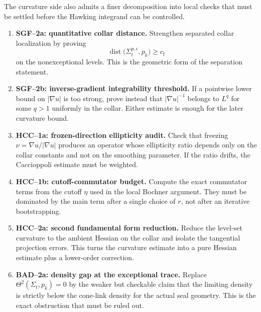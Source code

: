 \begin{remark}
\label{rem:TipNeckCurvatureHyperatomicRoadmap}
The curvature side also admits a finer decomposition into local checks that
must be settled before the Hawking integrand can be controlled.
\begin{enumerate}
    \item \textbf{SGF--2a: quantitative collar distance.}
    Strengthen separated collar localization by proving
    \[
        \operatorname{dist}\bigl(\Sigma_t^{p,\epsilon},p_k\bigr)\ge c_t
    \]
    on the nonexceptional levels.  This is the geometric form of the
    separation statement.

    \item \textbf{SGF--2b: inverse-gradient integrability threshold.}
    If a pointwise lower bound on \(|\nabla u|\) is too strong, prove instead
    that \(|\nabla u|^{-1}\) belongs to \(L^q\) for some \(q>1\) uniformly in
    the collar.  Either estimate is enough for the later curvature bound.

    \item \textbf{HCC--1a: frozen-direction ellipticity audit.}
    Check that freezing \(\nu=\nabla u/|\nabla u|\) produces an operator whose
    ellipticity ratio depends only on the collar constants and not on the
    smoothing parameter.  If the ratio drifts, the Caccioppoli estimate must
    be weighted.

    \item \textbf{HCC--1b: cutoff-commutator budget.}
    Compute the exact commutator terms from the cutoff \(\eta\) used in the
    local Bochner argument.  They must be dominated by the main term after a
    single choice of \(r\), not after an iterative bootstrapping.

    \item \textbf{HCC--2a: second fundamental form reduction.}
    Reduce the level-set curvature to the ambient Hessian on the collar and
    isolate the tangential projection errors.  This turns the curvature
    estimate into a pure Hessian estimate plus a lower-order correction.

    \item \textbf{BAD--2a: density gap at the exceptional trace.}
    Replace \(\Theta^2(\Sigma_t,p_k)=0\) by the weaker but checkable claim
    that the limiting density is strictly below the cone-link density for the
    actual seal geometry.  This is the exact obstruction that must be ruled
    out.


\end{enumerate}
\end{remark}
